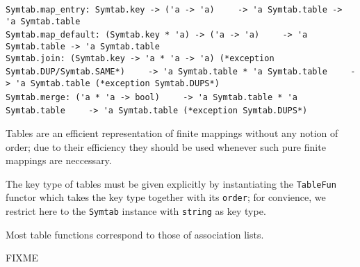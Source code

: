 \begin{isabellebody}
\begin{isamarkuptext}
\begin{mldecls}
  \verb|Symtab.map_entry: Symtab.key -> ('a -> 'a)|\isasep\isanewline%
\verb|    -> 'a Symtab.table -> 'a Symtab.table| \\
  \verb|Symtab.map_default: (Symtab.key * 'a) -> ('a -> 'a)|\isasep\isanewline%
\verb|    -> 'a Symtab.table -> 'a Symtab.table| \\
  \verb|Symtab.join: (Symtab.key -> 'a * 'a -> 'a) (*exception Symtab.DUP/Symtab.SAME*)|\isasep\isanewline%
\verb|    -> 'a Symtab.table * 'a Symtab.table|\isasep\isanewline%
\verb|    -> 'a Symtab.table (*exception Symtab.DUPS*)| \\
  \verb|Symtab.merge: ('a * 'a -> bool)|\isasep\isanewline%
\verb|    -> 'a Symtab.table * 'a Symtab.table|\isasep\isanewline%
\verb|    -> 'a Symtab.table (*exception Symtab.DUPS*)|
  \end{mldecls}%
\end{isamarkuptext}%
\isamarkuptrue%
%
\begin{isamarkuptext}%
Tables are an efficient representation of finite mappings without
  any notion of order;  due to their efficiency they should be used
  whenever such pure finite mappings are neccessary.

  The key type of tables must be given explicitly by instantiating
  the \verb|TableFun| functor which takes the key type
  together with its \verb|order|; for convience, we restrict
  here to the \verb|Symtab| instance with \verb|string|
  as key type.

  Most table functions correspond to those of association lists.%
\end{isamarkuptext}%
\isamarkuptrue%
%
\isamarkuptrue%
%
\isamarkuptrue%
%
\begin{isamarkuptext}%
FIXME%
\end{isamarkuptext}%
\isamarkuptrue%
%
\isadelimtheory
%
\endisadelimtheory
%
\isatagtheory
{}\isamarkupfalse%
%
\endisatagtheory
{\isafoldtheory}%
%
\isadelimtheory
%
\endisadelimtheory
\isanewline
\end{isabellebody}%
